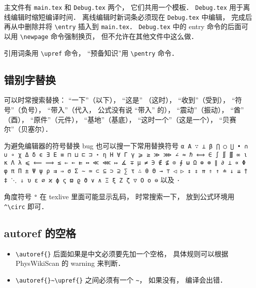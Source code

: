 主文件有 \verb|main.tex| 和 \verb|Debug.tex| 两个， 它们共用一个模板． \verb|Debug.tex| 用于离线编辑时缩短编译时间． 离线编辑时新词条必须现在 \verb|Debug.tex| 中编辑， 完成后再从中删除并将 \verb|\entry| 插入到 \verb|main.tex|． \verb|Debug.tex| 中的 entry 命令的后面可以用 \verb|\newpage| 命令强制换页， 但不允许在其他文件中这么做．

引用词条用 \verb|\upref| 命令， “预备知识”用 \verb|\pentry| 命令．

\subsection{错别字替换}
可以时常搜索替换： “一下”（以下）， “这是” （这时）， “收到”（受到）， “符号”（负号）， “带入”（代入， 公式没有说 “带入” 的）， “震动”（振动）， “酋” （酉）， “原件”（元件）， “基地”（基底）， “这时一个”（这是一个）， “贝赛尔”（贝塞尔）．

为避免编辑器的符号替换 bug 也可以搜一下常用替换符号 \verb|α Α ∵ ⊥ β ⋂ ◯ ⋃ • ∩ ∪ ∘ χ Δ δ ϵ ∃ Ε ≡ ⊓ ⊔ ⊏ ⊐ ⋆ η Η ∀ Γ γ ⩾ ≥ ≫ ⋙ ∠ ≈ ℏ ⟺ ∈ ∫ ∬ ∭ ∞ ι κ Λ λ ⩽ ⟸ ⟹ ≤ ⇐ ← ⇇ ↔ ≪ ⋘ ↦ ∡ ∓ μ ≠ ∋ ∉ ⊈ ⊙ ∮ ω Ω ⊕ ⊗ ∥ ∂ ⟂ ∝ Φ φ π Π ± Ψ ψ ρ ⇉ ⇒ σ Σ ∼ ≃ ⊂ ⊆ ⊃ ⊇ ∑ τ ∴ θ Θ → ⊤ ◁ ▷ ↕ ⇕ ⇈ ⇑ ↑ ≐ ↓ ⇊ † ‡ ⋱ ⇓ υ ε ∅ ϰ ϕ ς ϖ ϱ ϑ ∨ ∧ Ξ ξ Ζ ζ ▽ Ο ο ⊖| 以及 \verb|·|

角度符号 \verb|°| 在 texlive 里面可能显示乱码， 时常搜索一下， 放到公式环境用 \verb|^\circ| 即可．

\subsection{autoref 的空格}
\begin{itemize}
\item \verb|\autoref{}| 后面如果是中文必须要先加一个空格， 具体规则可以根据 PhysWikiScan 的 warning 来判断．
\item \verb|\autoref{}~\upref{}| 之间必须有一个 \verb|~|， 如果没有， 编译会出错．
\end{itemize}
